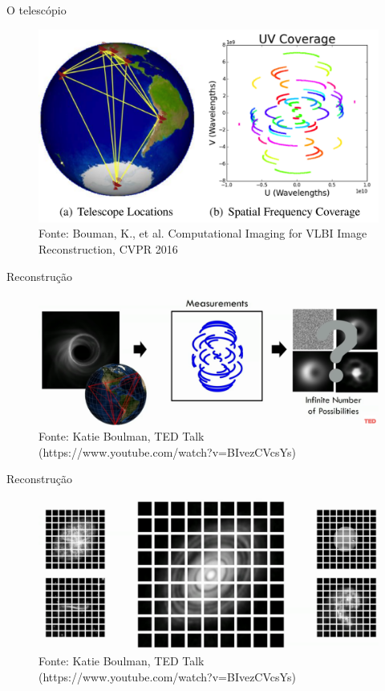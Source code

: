 \documentclass{beamer}
\begin{document}
\begin{frame}{O telesc\'opio}
    \begin{figure}
        \includegraphics[scale=0.25]{figs/disco-ball3.png}
        \caption{Fonte: Bouman, K., et al. Computational Imaging for VLBI Image
        Reconstruction, CVPR 2016}
    \end{figure}
\end{frame}

\begin{frame}{Reconstru\c{c}\~ao}
    \begin{figure}
        \includegraphics[scale=0.25]{figs/disco-ball4.png}
        \caption{Fonte: Katie Boulman, TED
        Talk (https://www.youtube.com/watch?v=BIvezCVcsYs)}
    \end{figure}
\end{frame}

\begin{frame}{Reconstru\c{c}\~ao}
    \begin{figure}
        \includegraphics[width=\textwidth]{figs/reconstrucao1.png}
        \caption{Fonte: Katie Boulman, TED
        Talk (https://www.youtube.com/watch?v=BIvezCVcsYs)}
    \end{figure}
\end{frame}
\end{document}
